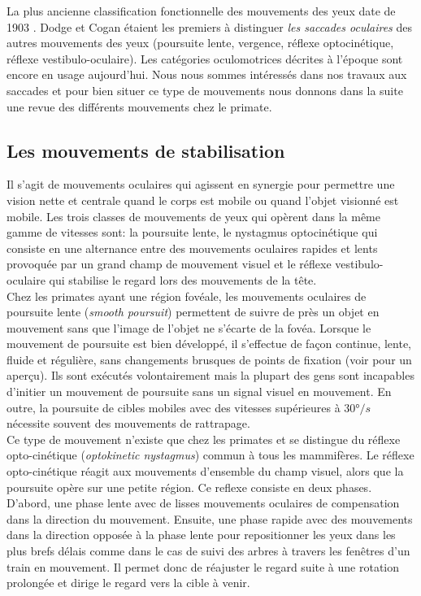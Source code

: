 La plus ancienne classification fonctionnelle des mouvements des yeux date de 1903 \cite{Dodge:1903}. Dodge et Cogan étaient les premiers à distinguer \textit{les saccades oculaires} des autres mouvements des yeux (poursuite lente, vergence, réflexe optocinétique, réflexe vestibulo-oculaire). Les catégories oculomotrices décrites à l'époque sont encore en usage aujourd'hui. Nous nous sommes intéressés dans nos travaux aux saccades et pour bien situer ce type de mouvements nous donnons dans la suite une revue des différents mouvements chez le primate. \\
 

\subsection{Les mouvements de stabilisation}

Il s'agit de mouvements oculaires qui agissent en synergie pour permettre une vision nette et centrale quand le corps est mobile ou quand l'objet visionné est mobile. Les trois classes de mouvements de yeux qui opèrent dans la même gamme de vitesses sont: la poursuite lente, le nystagmus optocinétique qui consiste en une alternance entre des mouvements oculaires rapides et lents provoquée par un grand champ de mouvement visuel et le réflexe vestibulo-oculaire qui stabilise le regard lors des mouvements de la tête. \\

Chez les primates ayant une région fovéale, les mouvements oculaires de poursuite lente (\textit{smooth poursuit}) permettent de suivre de près un objet en mouvement sans que l'image de l'objet ne s'écarte de la fovéa. Lorsque le mouvement de poursuite est bien développé, il s'effectue de façon continue, lente, fluide et régulière, sans changements brusques de points de fixation (voir \cite{Leigh:1999, Ilg:1997} pour un aperçu). Ils sont exécutés volontairement mais la plupart des gens sont incapables d'initier un mouvement de poursuite sans un signal visuel en mouvement. En outre, la poursuite de cibles mobiles avec des vitesses supérieures à $30°/s$ nécessite souvent des mouvements de rattrapage. \\

Ce type de mouvement n'existe que chez les primates \cite{Buttner:1988} et se distingue du réflexe opto-cinétique (\textit{optokinetic nystagmus}) commun à tous les mammifères. Le réflexe opto-cinétique réagit aux mouvements d'ensemble du champ visuel, alors que la poursuite opère sur une petite région. Ce reflexe consiste en deux phases. D'abord, une phase lente avec de lisses mouvements oculaires de compensation dans la direction du mouvement. Ensuite, une phase rapide avec des mouvements dans la direction opposée à la phase lente pour repositionner les yeux dans les plus brefs délais comme dans le cas de suivi des arbres à travers les fenêtres d'un train en mouvement. Il permet donc de réajuster le regard suite à une rotation prolongée et dirige le regard vers la cible à venir.\\


